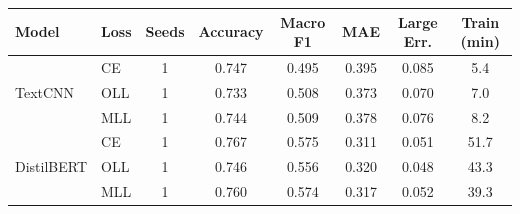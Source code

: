 \begin{tabular}{llcccccc}
\toprule
Model & Loss & Seeds & Accuracy & Macro F1 & MAE & Large Err. & Train (min) \\
\midrule
\multirow{3}{*}{TextCNN} & CE & 1 & 0.747 & 0.495 & 0.395 & 0.085 & 5.4 \\
 & OLL & 1 & 0.733 & 0.508 & 0.373 & 0.070 & 7.0 \\
 & MLL & 1 & 0.744 & 0.509 & 0.378 & 0.076 & 8.2 \\
\midrule
\multirow{3}{*}{DistilBERT} & CE & 1 & 0.767 & 0.575 & 0.311 & 0.051 & 51.7 \\
 & OLL & 1 & 0.746 & 0.556 & 0.320 & 0.048 & 43.3 \\
 & MLL & 1 & 0.760 & 0.574 & 0.317 & 0.052 & 39.3 \\
\bottomrule
\end{tabular}
